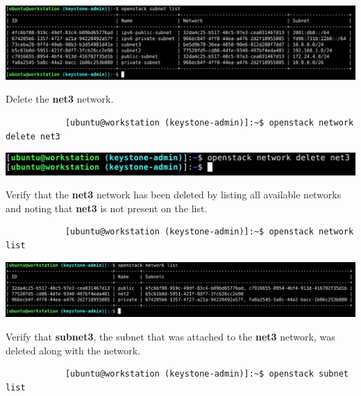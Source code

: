 \documentclass[letterpaper, 12pt]{article}
\begin{document}
\begin{enumerate}
\begin{labstep}
        \begin{center}
            \includegraphics[width=\linewidth]{images/part3/step19.png}
        \end{center}
    \end{labstep}

    \begin{labstep}
        Delete the \textbf{net3} network.
        \begin{lstlisting}
            [ubuntu@workstation (keystone-admin)]:~$ openstack network delete net3
        \end{lstlisting}

        \begin{center}
            \includegraphics[width=\linewidth]{images/part3/step20.png}
        \end{center}
    \end{labstep}

    \begin{labstep}
        Verify that the \textbf{net3} network has been deleted by listing all available networks and noting that \textbf{net3} is not present on the list.
        \begin{lstlisting}
            [ubuntu@workstation (keystone-admin)]:~$ openstack network list
        \end{lstlisting}

        \begin{center}
            \includegraphics[width=\linewidth]{images/part3/step21.png}
        \end{center}
    \end{labstep}

    \begin{labstep}
        Verify that \textbf{subnet3}, the subnet that was attached to the \textbf{net3} network, was deleted along with the network.
        \begin{lstlisting}
            [ubuntu@workstation (keystone-admin)]:~$ openstack subnet list
        \end{lstlisting}


\end{labstep}
\end{enumerate}
\end{document}
